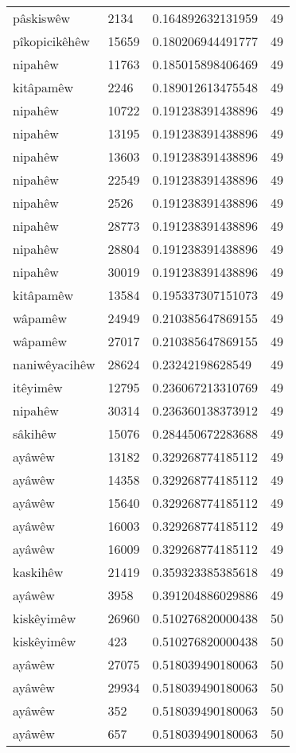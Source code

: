 \begin{longtable}{llll}
pâskiswêw & 2134 & 0.164892632131959 & 49\\
pîkopicikêhêw & 15659 & 0.180206944491777 & 49\\
nipahêw & 11763 & 0.185015898406469 & 49\\
kitâpamêw & 2246 & 0.189012613475548 & 49\\
nipahêw & 10722 & 0.191238391438896 & 49\\
nipahêw & 13195 & 0.191238391438896 & 49\\
nipahêw & 13603 & 0.191238391438896 & 49\\
nipahêw & 22549 & 0.191238391438896 & 49\\
nipahêw & 2526 & 0.191238391438896 & 49\\
nipahêw & 28773 & 0.191238391438896 & 49\\
nipahêw & 28804 & 0.191238391438896 & 49\\
nipahêw & 30019 & 0.191238391438896 & 49\\
kitâpamêw & 13584 & 0.195337307151073 & 49\\
wâpamêw & 24949 & 0.210385647869155 & 49\\
wâpamêw & 27017 & 0.210385647869155 & 49\\
naniwêyacihêw & 28624 & 0.23242198628549 & 49\\
itêyimêw & 12795 & 0.236067213310769 & 49\\
nipahêw & 30314 & 0.236360138373912 & 49\\
sâkihêw & 15076 & 0.284450672283688 & 49\\
ayâwêw & 13182 & 0.329268774185112 & 49\\
ayâwêw & 14358 & 0.329268774185112 & 49\\
ayâwêw & 15640 & 0.329268774185112 & 49\\
ayâwêw & 16003 & 0.329268774185112 & 49\\
ayâwêw & 16009 & 0.329268774185112 & 49\\
kaskihêw & 21419 & 0.359323385385618 & 49\\
ayâwêw & 3958 & 0.391204886029886 & 49\\
kiskêyimêw & 26960 & 0.510276820000438 & 50\\
kiskêyimêw & 423 & 0.510276820000438 & 50\\
ayâwêw & 27075 & 0.518039490180063 & 50\\
ayâwêw & 29934 & 0.518039490180063 & 50\\
ayâwêw & 352 & 0.518039490180063 & 50\\
ayâwêw & 657 & 0.518039490180063 & 50\\

\end{longtable}
